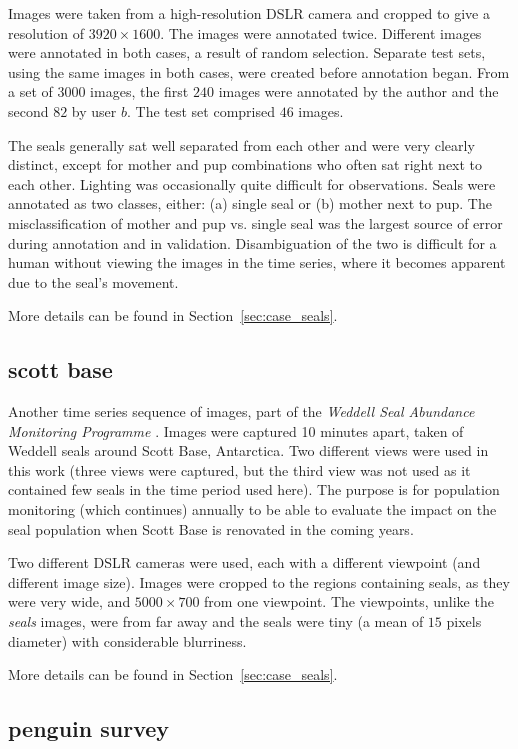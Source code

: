 Images were taken from a high-resolution DSLR camera and cropped to give a resolution of $3920\times1600$. The images were annotated twice. Different images were annotated in both cases, a result of random selection. Separate test sets, using the same images in both cases, were created before annotation began. From a set of $3000$ images, the first $240$ images were annotated by the author and the second $82$ by user $b$. The test set comprised $46$ images.

The seals generally sat well separated from each other and were very clearly distinct, except for mother and pup combinations who often sat right next to each other. Lighting was occasionally quite difficult for observations. Seals were annotated as two classes, either: (a) single seal or (b) mother next to pup.  The misclassification of mother and pup vs. single seal was the largest source of error during annotation and in validation. Disambiguation of the two is difficult for a human without viewing the images in the time series, where it becomes apparent due to the seal's movement.

More details can be found in Section~\ref{sec:case_seals}.

\subsection{scott base}
    
Another time series sequence of images, part of the \emph{Weddell Seal Abundance Monitoring Programme} \cite{Eisert2019}. Images were captured 10 minutes apart, taken of Weddell seals around Scott Base, Antarctica. Two different views were used in this work (three views were captured, but the third view was not used as it contained few seals in the time period used here). The purpose is for population monitoring (which continues) annually to be able to evaluate the impact on the seal population when Scott Base is renovated in the coming years. 

Two different DSLR cameras were used, each with a different viewpoint (and different image size). Images were cropped to the regions containing seals, as they were very wide, and $5000\times700$ from one viewpoint. The viewpoints, unlike the \emph{seals} images, were from far away and the seals were tiny (a mean of $15$ pixels diameter) with considerable blurriness.  
    
More details can be found in Section~\ref{sec:case_seals}.
    
\subsection{penguin survey}
    
